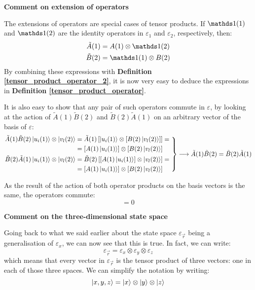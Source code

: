 \textbf{Comment on extension of operators} 

The extensions of operators are special cases of tensor products. If $\Imat(1)$ and $\Imat(2)$ are the identity operators in $\varepsilon_1$ and $\varepsilon_2$, respectively, then:
\begin{equation}
    \begin{split}
        \tilde{A}(1) &= A(1)\otimes \Imat(2)\\
        \tilde{B}(2) &= \Imat(1)\otimes B(2)
    \end{split}
\end{equation}
By combining these expressions with \textbf{Definition \ref{tensor_product_operator_2}}, it is now very easy to deduce the expressions in \textbf{Definition \ref{tensor_product_operator}}.

It is also easy to show that any pair of such operators commute in $\varepsilon$, by looking at the action of $\tilde{A}(1)\tilde{B}(2)$ and $\tilde{B}(2)\tilde{A}(1)$ on an arbitrary vector of the basis of $\varepsilon$:
\begin{equation}
    \left.
        \begin{split}
            \tilde{A}(1)\tilde{B}(2)\ket{u_i(1)}\otimes\ket{v_l(2)} &= \tilde{A}(1)\left[\ket{u_i(1)}\otimes\left[B(2)\ket{v_l(2)}\right]\right] =\\
            &= \left[A(1)\ket{u_i(1)}\right]\otimes\left[B(2)\ket{v_l(2)}\right] \\
            \tilde{B}(2)\tilde{A}(1)\ket{u_i(1)}\otimes\ket{v_l(2)} &= \tilde{B}(2)\left[\left[A(1)\ket{u_i(1)}\right]\otimes\ket{v_l(2)}\right] =\\
            &= \left[A(1)\ket{u_i(1)}\right]\otimes\left[B(2)\ket{v_l(2)}\right]
        \end{split}
    \ \right\} \longrightarrow \tilde{A}(1)\tilde{B}(2) = \tilde{B}(2)\tilde{A}(1)
\end{equation}

As the result of the action of both operator products on the basis vectors is the same, the operators commute:
\begin{equation}
    [\tilde{A}(1), \tilde{B}(2)] = 0
\end{equation}

\textbf{Comment on the three-dimensional state space}

Going back to what we said earlier about the state space $\varepsilon_{\vec{r}}$ being a generalisation of $\varepsilon_x$, we can now see that this is true. In fact, we can write:
\begin{equation}
    \varepsilon_{\vec{r}} = \varepsilon_x \otimes \varepsilon_y \otimes \varepsilon_z
\end{equation}
which means that every vector in $\varepsilon_{\vec{r}}$ is the tensor product of three vectors: one in each of those three spaces. We can simplify the notation by writing:
\begin{equation}
    \ket{x, y, z} = \ket{x}\otimes\ket{y}\otimes\ket{z}
\end{equation}

